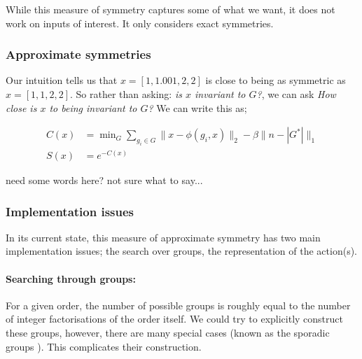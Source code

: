 While this measure of symmetry captures some of what we want, it does not work on inputs of interest.
It only considers exact symmetries.

\subsubsection{Approximate symmetries}

Our intuition tells us that $x = [1,1.001,2,2]$ is close to being as symmetric as
$x = [1,1,2,2]$. So rather than asking: \textit{is $x$ invariant to $G$?}, we can ask
\textit{How close is $x$ to being invariant to $G$?} We can write this as;


\begin{align*}
C(x) &= \mathop{\text{min}}_G \sum_{g_i\in G}\parallel x-\phi(g_i, x)\parallel_2 - \beta \parallel n-|G^{* }| \parallel_1 \label{eq:sym-measure}\\
S(x) &= e^{-C(x)}
\end{align*}


{\color{red}need some words here? not sure what to say...}

\subsubsection{Implementation issues}\label{implementation-issues}

In its current state, this measure of approximate symmetry has two main implementation issues;
the search over groups, the representation of the action(s).

\paragraph{Searching through groups:}\label{searching-through-groups} For a given order, the number of possible
groups is roughly equal to the number of integer factorisations of the order itself.
We could try to explicitly construct these groups, however, there are many special cases (known as the sporadic groups \cite{Conway1985}).
This complicates their construction\footnotemark.

